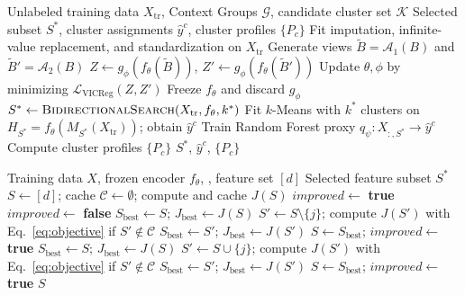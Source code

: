 \begin{algorithm}[t]
\caption{\method}
\label{alg:main}
\footnotesize
\begin{algorithmic}[1]
\Require Unlabeled training data $X_{\mathrm{tr}}$, Context Groups $\mathcal{G}$, candidate cluster set $\mathcal{K}$
\Ensure Selected subset $S^{*}$, cluster assignments $\hat{y}^{c}$, cluster profiles $\{P_c\}$
\State Fit imputation, infinite-value replacement, and standardization on $X_{\mathrm{tr}}$
    \State Generate views $\tilde{B} = \mathcal{A}_1(B)$ and $\tilde{B}' = \mathcal{A}_2(B)$
    \State $Z \gets g_\phi(f_\theta(\tilde{B}))$, \; $Z' \gets g_\phi(f_\theta(\tilde{B}'))$
    \State Update $\theta, \phi$ by minimizing $\mathcal{L}_{\mathrm{VICReg}}(Z, Z')$
  \EndFor
\EndFor
\State Freeze $f_\theta$ and discard $g_\phi$
\State {}
\State $S^{*} \gets \textsc{BidirectionalSearch}(X_{\mathrm{tr}}, f_\theta, k^{*})$
\State Fit $k$-Means with $k^{*}$ clusters on $H_{S^{*}} = f_\theta(M_{S^{*}}(X_{\mathrm{tr}}))$; obtain $\hat{y}^{c}$
\State {}
\State Train Random Forest proxy $q_\psi : X_{:,S^{*}} \rightarrow \hat{y}^{c}$ 
\State {}
\State Compute cluster profiles $\{P_c\}$ 
\State \Return $S^{*}$, $\hat{y}^{c}$, $\{P_c\}$
\end{algorithmic}
\end{algorithm}

\begin{algorithm}[t]
\caption{Bidirectional Latent Silhouette Search}
\label{alg:search}
\footnotesize
\begin{algorithmic}[1]
\Require Training data $X$, frozen encoder $f_\theta$, , feature set $[d]$
\Ensure Selected feature subset $S^{*}$
\State $S \gets [d]$; cache $\mathcal{C} \gets \emptyset$; compute and cache $J(S)$
\State $improved \gets$ \textbf{true}
  \State $improved \gets$ \textbf{false}
  \State $S_{\mathrm{best}} \gets S$; $J_{\mathrm{best}} \gets J(S)$ 
    \State $S' \gets S \setminus \{j\}$; compute $J(S')$ with Eq.~\eqref{eq:objective} if $S' \notin \mathcal{C}$
     $S_{\mathrm{best}} \gets S'$; $J_{\mathrm{best}} \gets J(S')$ \EndIf
  \EndFor
   $S \gets S_{\mathrm{best}}$; $improved \gets$ \textbf{true} \EndIf
  \State $S_{\mathrm{best}} \gets S$; $J_{\mathrm{best}} \gets J(S)$ 
    \State $S' \gets S \cup \{j\}$; compute $J(S')$ with Eq.~\eqref{eq:objective} if $S' \notin \mathcal{C}$
     $S_{\mathrm{best}} \gets S'$; $J_{\mathrm{best}} \gets J(S')$ \EndIf
  \EndFor
   $S \gets S_{\mathrm{best}}$; $improved \gets$ \textbf{true} \EndIf
\EndWhile
\State \Return $S$
\end{algorithmic}
\end{algorithm}


